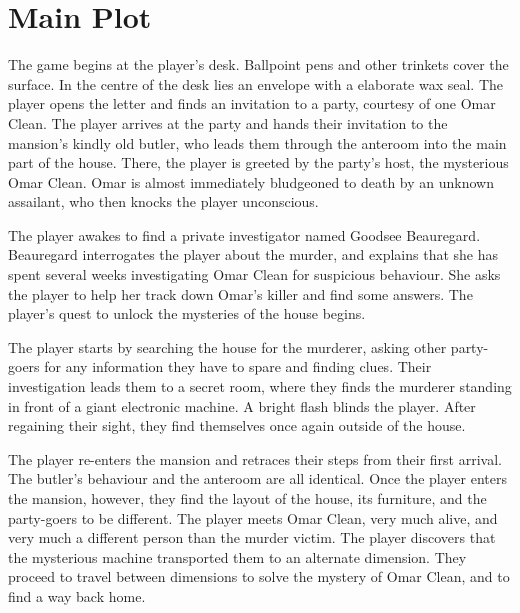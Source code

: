 \section{Main Plot}
\label{sec:mainplot}
The game begins at the player's desk. Ballpoint pens and other trinkets cover the surface. In the centre of the desk lies an envelope with a elaborate wax seal. The player opens the letter and finds an invitation to a party, courtesy of one Omar Clean. The player arrives at the party and hands their invitation to the mansion's kindly old butler, who leads them through the anteroom into the main part of the house. There, the player is greeted by the party's host, the mysterious Omar Clean. Omar is almost immediately bludgeoned to death by an unknown assailant, who then knocks the player unconscious.

The player awakes to find a private investigator named Goodsee Beauregard. Beauregard interrogates the player about the murder, and explains that she has spent several weeks investigating Omar Clean for suspicious behaviour. She asks the player to help her track down Omar's killer and find some answers. The player's quest to unlock the mysteries of the house begins.

The player starts by searching the house for the murderer, asking other party-goers for any information they have to spare and finding clues. Their investigation leads them to a secret room, where they finds the murderer standing in front of a giant electronic machine. A bright flash blinds the player. After regaining their sight, they find themselves once again outside of the house.

The player re-enters the mansion and retraces their steps from their first arrival. The butler's behaviour and the anteroom are all identical. Once the player enters the mansion, however, they find the layout of the house, its furniture, and the party-goers to be different. The player meets Omar Clean, very much alive, and very much a different person than the murder victim. The player discovers that the mysterious machine transported them to an alternate dimension. They proceed to travel between dimensions to solve the mystery of Omar Clean, and to find a way back home.

